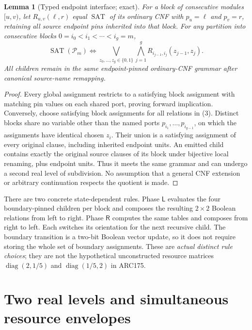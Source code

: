 \documentclass[11pt]{article}
\newtheorem{lemma}[theorem]{Lemma}
\newcommand{\SAT}{\operatorname{SAT}}
\begin{document}
\begin{lemma}[Typed endpoint interface; exact]
For a block of consecutive modules $[u,v)$,
let $R_{u,v}(\ell,r)$ equal $\SAT$ of its ordinary CNF with
$p_u=\ell$ and $p_v=r$, retaining all source endpoint
pins inherited into that block. For any partition into
consecutive blocks $0=i_0<i_1<\cdots<i_g=m$,
\[
 \SAT(\mathcal{P}_m)\iff
 \bigvee_{z_0,\ldots,z_g\in\{0,1\}}
 \bigwedge_{j=1}^{g}R_{i_{j-1},i_j}(z_{j-1},z_j).
 \tag{3}
\]
All children remain in the \emph{same} endpoint-pinned
ordinary-CNF grammar after canonical source-name remapping.
\end{lemma}
\begin{proof}
Every global assignment restricts to a satisfying block
assignment with matching pin values on each shared port,
proving forward implication. Conversely, choose satisfying
block assignments for all relations in (3). Distinct blocks
share no variable other than the named ports
$p_{i_1},\dots,p_{i_{g-1}}$, on which the assignments have
identical chosen $z_i$. Their union is a satisfying assignment
of every original clause, including inherited endpoint units.
An emitted child contains exactly the original source clauses
of its block under bijective local renaming, plus endpoint
units. Thus it meets the same grammar and can undergo a
second real level of subdivision. No assumption that a
general CNF extension or arbitrary continuation respects
the quotient is made.
\end{proof}

There are two concrete state-dependent rules. Phase $\mathsf L$
evaluates the four boundary-pinned children per block and
composes the resulting $2\times2$ Boolean relations from
left to right. Phase $\mathsf R$ computes the same tables
and composes from right to left. Each switches its
orientation for the next recursive child. The boundary
transition is a two-bit Boolean vector update, so it does
not require storing the whole set of boundary assignments.
These are \emph{actual distinct rule choices}; they
are not the hypothetical unconstructed resource matrices
$\operatorname{diag}(2,1/5)$ and
$\operatorname{diag}(1/5,2)$ in ARC175.

\section{Two real levels and simultaneous resource envelopes}
\end{document}
